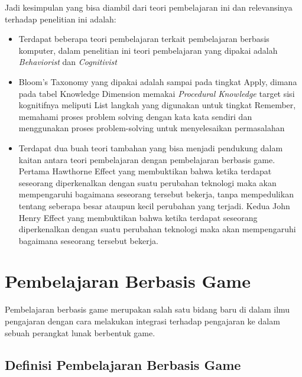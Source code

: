 	Jadi kesimpulan yang bisa diambil dari teori pembelajaran ini dan relevansinya terhadap penelitian ini adalah:
	\begin{itemize}
		\item Terdapat beberapa teori pembelajaran terkait pembelajaran berbasis komputer, dalam penelitian ini teori pembelajaran yang dipakai adalah \textit{Behaviorist} dan \textit{Cognitivist}
		\item Bloom's Taxonomy yang dipakai adalah sampai pada tingkat Apply, dimana pada tabel Knowledge Dimension memakai \textit{Procedural Knowledge} target sisi kognitifnya meliputi List langkah yang digunakan untuk tingkat Remember, memahami proses problem solving dengan kata kata sendiri dan menggunakan proses problem-solving untuk menyelesaikan permasalahan
		\item Terdapat dua buah teori tambahan yang bisa menjadi pendukung dalam kaitan antara teori pembelajaran dengan pembelajaran berbasis game. Pertama  Hawthorne Effect yang membuktikan bahwa ketika terdapat seseorang diperkenalkan dengan suatu perubahan teknologi maka akan mempengaruhi bagaimana seseorang tersebut bekerja, tanpa mempedulikan tentang seberapa besar ataupun kecil perubahan yang terjadi. Kedua John Henry Effect yang membuktikan bahwa ketika terdapat seseorang diperkenalkan dengan suatu perubahan teknologi maka akan mempengaruhi bagaimana seseorang tersebut bekerja.
	\end{itemize}
	
\section{Pembelajaran Berbasis Game}
Pembelajaran berbasis game merupakan salah satu bidang baru di dalam ilmu pengajaran dengan cara melakukan integrasi terhadap pengajaran ke dalam sebuah perangkat lunak berbentuk game. 

	\subsection{Definisi Pembelajaran Berbasis Game}
	
